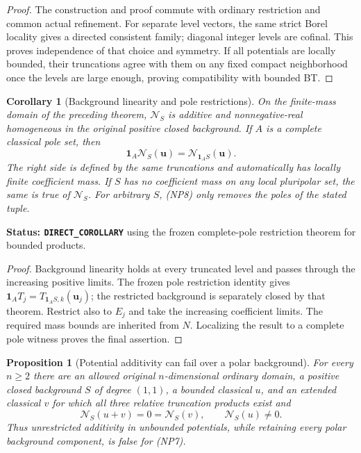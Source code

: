 \documentclass[11pt,a4paper]{article}
\numberwithin{equation}{section}
\newtheorem{proposition}[theorem]{Proposition}
\newtheorem{corollary}[theorem]{Corollary}
\theoremstyle{definition}
\theoremstyle{remark}
\begin{document}
\begin{proof}
The construction and proof commute with ordinary restriction and
common actual refinement.  For separate level vectors, the same
strict Borel locality gives a directed consistent family; diagonal
integer levels are cofinal.  This proves independence of that choice
and symmetry.  If all potentials are locally bounded, their
truncations agree with them on any fixed compact neighborhood once
the levels are large enough, proving compatibility with bounded BT.
\end{proof}

\begin{corollary}[Background linearity and pole restrictions]
\label{cor:r11-nonpolar-background-restriction}
On the finite-mass domain of the preceding theorem, $\mathcal N_S$
is additive and nonnegative-real homogeneous in the original positive
closed background.  If $A$ is a complete classical pole set, then
\[
 \mathbf1_A\mathcal N_S(\mathbf u)
                    =\mathcal N_{\mathbf1_A S}(\mathbf u).
 \tag{NP14}
\]
The right side is defined by the same truncations and automatically
has locally finite coefficient mass.  If $S$ has no coefficient mass
on any local pluripolar set, the same is true of $\mathcal N_S$.
For arbitrary $S$, (NP8) only removes the poles of the stated tuple.
\end{corollary}

\noindent\textbf{Status: \texttt{DIRECT\_COROLLARY}} using the
frozen complete-pole restriction theorem for bounded products.

\begin{proof}
Background linearity holds at every truncated level and passes through
the increasing positive limits.  The frozen pole restriction identity
gives $\mathbf1_A T_j=T_{\mathbf1_A S,k}(\mathbf u_j)$;
the restricted background is separately closed by that theorem.
Restrict also to $E_j$ and take the increasing coefficient limits.
The required mass bounds are inherited from $N$.  Localizing the
result to a complete pole witness proves the final assertion.
\end{proof}

\begin{proposition}[Potential additivity can fail over a polar background]
\label{prop:r11-nonpolar-additivity-failure}
For every $n\geq2$ there are an allowed original $n$-dimensional
ordinary domain, a positive closed background $S$ of degree $(1,1)$,
a bounded classical $u$, and an extended classical $v$ for which all
three relative truncation products exist and
\[
 \mathcal N_S(u+v)=0=\mathcal N_S(v),
                   \qquad \mathcal N_S(u)\ne0.
 \tag{NP15}
\]
Thus unrestricted additivity in unbounded potentials, while retaining
every polar background component, is false for (NP7).
\end{proposition}
\end{document}
